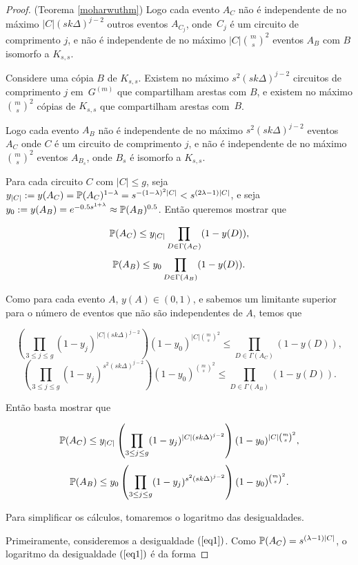 \begin{proof}{(Teorema \ref{moharwuthm})}
Logo cada evento $A_C$ não é independente de no máximo $|C|(sk\Delta)^{j-2}$ outros eventos $A_{C_j}$, onde~$C_j$ é um circuito de comprimento $j$, e não é independente de no máximo $|C|\binom{m}{s}^2$ eventos $A_B$ com $B$ isomorfo a $K_{s,s}$.

Considere uma cópia $B$ de $K_{s,s}$. Existem no máximo $s^2(sk\Delta)^{j-2}$ circuitos de comprimento $j$ em~$G^{(m)}$ que compartilham arestas com $B$, e existem no máximo $\binom{m}{s}^2$ cópias de $K_{s,s}$ que compartilham arestas com~$B$.

Logo cada evento $A_B$ não é independente de no máximo $s^2(sk\Delta)^{j-2}$ eventos $A_C$ onde $C$ é um circuito de comprimento $j$, e não é independente de no máximo $\binom{m}{s}^2$ eventos $A_{B_s}$, onde $B_s$ é isomorfo a $K_{s,s}$.

Para cada circuito $C$ com $|C| \leq g$, seja $y_{|C|} := y(A_C) = \mathbb{P}(A_C)^{1-\lambda} = s^{-(1-\lambda)^2|C|} < s^{(2\lambda - 1)|C|}$, e seja~$y_0 := y(A_B) = e^{-0.5s^{1+\lambda}} \approx \mathbb{P}(A_B)^{0.5}$. Então queremos mostrar que

\[\mathbb{P}(A_C) \leq y_{|C|}\prod_{D\in\Gamma(A_C)}(1-y(D)),\]
\[\mathbb{P}(A_B) \leq y_0\prod_{D\in\Gamma(A_B)}(1-y(D)).\]

Como para cada evento $A$, $y(A) \in (0,1)$, e sabemos um limitante superior para o número de eventos que não são independentes de $A$, temos que

\[\left(\prod_{3\leq j\leq g}(1-y_j)^{|C|(sk\Delta)^{j-2}}\right)(1-y_0)^{|C|\binom{m}{s}^2} \leq \prod_{D\in\Gamma(A_C)}(1-y(D)),\]
\[\left(\prod_{3\leq j\leq g}(1-y_j)^{s^2(sk\Delta)^{j-2}}\right)(1-y_0)^{\binom{m}{s}^2} \leq \prod_{D\in\Gamma(A_B)}(1-y(D)).\]

Então basta mostrar que

\begin{equation}\label{eq1}
\mathbb{P}(A_C) \leq y_{|C|}\left(\prod_{3\leq j\leq g}(1-y_j)^{|C|(sk\Delta)^{j-2}}\right)(1-y_0)^{|C|\binom{m}{s}^2},
\end{equation}
\begin{equation}\label{eq2}
\mathbb{P}(A_B)\leq y_0 \left(\prod_{3\leq j\leq g}(1-y_j)^{s^2(sk\Delta)^{j-2}}\right)(1-y_0)^{\binom{m}{s}^2}.
\end{equation}

Para simplificar os cálculos, tomaremos o logaritmo das desigualdades.

Primeiramente, consideremos a desigualdade $(\ref{eq1})$. Como $\mathbb{P}(A_C) = s^{(\lambda-1)|C|}$, o logaritmo da desigualdade $(\ref{eq1})$ é da forma


\end{proof}
